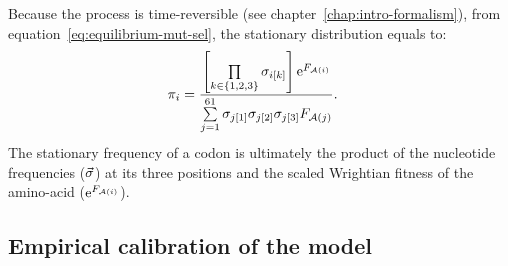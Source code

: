 Because the process is time-reversible (see chapter~\ref{chap:intro-formalism}), from equation~\ref{eq:equilibrium-mut-sel}, the stationary distribution equals to:
\begin{align}
    \pi_{{i}} & = \dfrac{\left[\prod\limits_{k \in \{ 1, 2, 3 \}} \sigma_{{i}[k]}\right]\text{e}^{F_{\mathcal{A}({i})}}}{\sum\limits_{{j}=1}^{61}\sigma_{{j}[1]}\sigma_{{j}[2]}\sigma_{{j}[3]}F_{\mathcal{A}({j})} }.
\end{align}
The stationary frequency of a codon is ultimately the product of the nucleotide frequencies ($\vec{\sigma}$) at its three positions and the scaled Wrightian fitness of the amino-acid ($\text{e}^{F_{\mathcal{A}({i})}}$).

\subsection{Empirical calibration of the model}
\label{subsec:empirical-calibration-HB}

